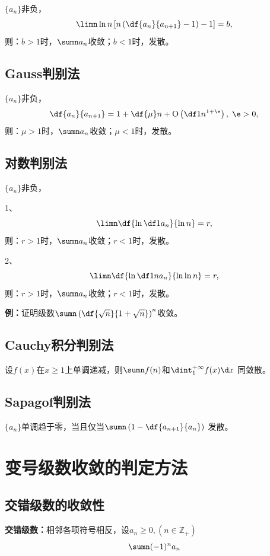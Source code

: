 \begin{shaded}
$\{a_n\}$非负，
$$\limn\ln n\left[n\left(\df{a_n}{a_{n+1}}-1\right)-1\right]=b,$$
则：$b>1$时，$\sumn a_n$收敛；$b<1$时，发散。


\subsection{Gauss判别法}

$\{a_n\}$非负，
$$\df{a_n}{a_{n+1}}=1+\df{\mu}n+\mathrm{O}\left(\df1{n^{1+\e}}\right),\;\e>0,$$
则：$\mu>1$时，$\sumn a_n$收敛；$\mu<1$时，发散。

\subsection{对数判别法}

$\{a_n\}$非负，

1、
$$\limn\df{\ln\df1{a_n}}{\ln n}=r,$$
则：$r>1$时，$\sumn a_n$收敛；$r<1$时，发散。

2、
$$\limn\df{\ln\df1{na_n}}{\ln\ln n}=r,$$
则：$r>1$时，$\sumn a_n$收敛；$r<1$时，发散。

{\bf 例：}证明级数$\sumn\left(\df{\sqrt n}{1+\sqrt n}\right)^n$收敛。

\subsection{Cauchy积分判别法}

设$f(x)$在$x\geq 1$上单调递减，则$\sumn f(n)$和$\dint_1^{+\infty}f(x)\d x$
同敛散。

\subsection{Sapagof判别法}

$\{a_n\}$单调趋于零，当且仅当$\sumn\left(1-\df{a_{n+1}}{a_n}\right)$
发散。

\end{shaded}

\section{变号级数收敛的判定方法}

\subsection{交错级数的收敛性}

{\bf 交错级数：}相邻各项符号相反，设$a_n\geq 0,(n\in\mathbb{Z}_+)$
$$\sumn(-1)^na_n$$

